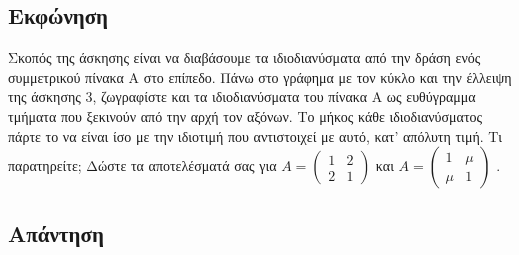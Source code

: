 \documentclass[a4paper,12pt]{article}
\begin{document}
\subsection{Εκφώνηση}
Σκοπός της άσκησης είναι να διαβάσουμε τα ιδιοδιανύσματα από την δράση ενός συμμετρικού πίνακα Α στο
επίπεδο. Πάνω στο γράφημα με τον κύκλο και την έλλειψη της άσκησης 3, ζωγραφίστε και τα ιδιοδιανύσματα
του πίνακα Α ως ευθύγραμμα τμήματα που ξεκινούν από την αρχή τον αξόνων. Το μήκος κάθε ιδιοδιανύσματος
πάρτε το να είναι ίσο με την ιδιοτιμή που αντιστοιχεί με αυτό, κατ' απόλυτη τιμή. Τι παρατηρείτε; Δώστε
τα αποτελέσματά σας για
$
	A=\begin{pmatrix}
		1 & 2 \\
		2 & 1
	\end{pmatrix}
$
και
$
	A=\begin{pmatrix}
		1   & \mu \\
		\mu & 1
	\end{pmatrix}
$
.
\subsection{Απάντηση}
\end{document}
